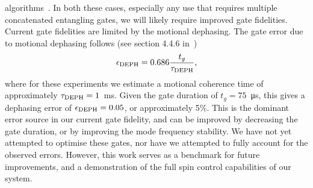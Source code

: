     algorithms~\cite{varona2024towards,brenner2024factoring}.  In both these cases, especially any use that requires
    multiple concatenated entangling gates, we will likely require improved gate
    fidelities. 
    Current gate fidelities are limited by the motional dephasing. The gate error due to motional dephasing follows (see section 4.4.6 in~\cite{ballance2017high-fidelity})
    \begin{equation}
        \epsilon_{\rm DEPH} = 0.686 \frac{t_g}{\tau_{\rm DEPH}},
    \end{equation}
    where for these experiments we estimate a motional coherence time of approximately $\tau_{\rm DEPH} = 1$~\unit{\ms}. Given the gate duration of $t_g = 75$~\unit{\us}, this gives a dephasing error of $\epsilon_{\rm DEPH} = 0.05$, or approximately 5\%. This is the dominant error source in our current gate fidelity, and can be improved by decreasing the gate duration, or by improving the mode frequency stability. We have not yet attempted to optimise these gates, nor have we attempted to fully account for the observed errors. However, this work serves as a benchmark for future improvements, and a demonstration of the full spin control capabilities of our system. \\
    